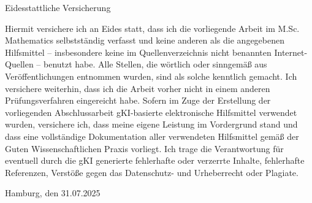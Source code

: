 \documentclass[10pt,a4paper,oneside]{book}
\begin{document}
	
	\tableofcontents
	\newpage
    \setlength{\parindent}{0em} 
    
	\newpage
	
    \newpage
    
    \newpage
	
	\newpage
	
	\newpage
	


        

	\printbibliography
	
	\newpage
	\thispagestyle{plain}

	\begin{center}
		Eidesstattliche Versicherung
	\end{center}

	Hiermit versichere ich an Eides statt, dass ich die vorliegende Arbeit im
	M.Sc. Mathematics selbstständig verfasst und keine anderen als die angegebenen
	Hilfsmittel – insbesondere keine im Quellenverzeichnis nicht benannten
	Internet-Quellen – benutzt habe. Alle Stellen, die wörtlich oder sinngemäß
	aus Veröffentlichungen entnommen wurden, sind als solche kenntlich gemacht.
	Ich versichere weiterhin, dass ich die Arbeit vorher nicht in einem anderen
	Prüfungsverfahren eingereicht habe.  
	Sofern im Zuge der Erstellung der vorliegenden Abschlussarbeit gKI-basierte
	elektronische Hilfsmittel verwendet wurden, versichere ich, dass meine eigene
	Leistung im Vordergrund stand und dass eine vollständige Dokumentation aller
	verwendeten Hilfsmittel gemäß der Guten Wissenschaftlichen Praxis vorliegt. Ich
	trage die Verantwortung für eventuell durch die gKI generierte fehlerhafte oder
	verzerrte Inhalte, fehlerhafte Referenzen, Verstöße gegen das Datenschutz- und
	Urheberrecht oder Plagiate.

	\medskip
	
	Hamburg, den 31.07.2025
\end{document}
